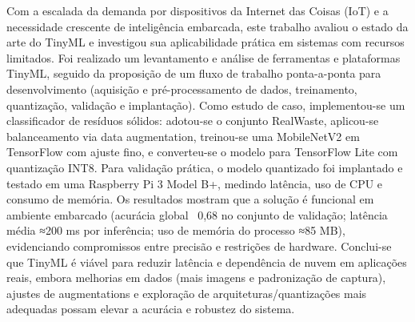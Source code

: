 \documentclass[repeatfields,xlists,xpacks,oneside]{ufrgscca}
\begin{document}
\begin{mainabstract}

Com a escalada da demanda por dispositivos da Internet das Coisas (IoT) e a necessidade crescente de inteligência embarcada, este trabalho avaliou o estado da arte do TinyML e investigou sua aplicabilidade prática em sistemas com recursos limitados. Foi realizado um levantamento e análise de ferramentas e plataformas TinyML, seguido da proposição de um fluxo de trabalho ponta-a-ponta para desenvolvimento (aquisição e pré-processamento de dados, treinamento, quantização, validação e implantação). Como estudo de caso, implementou-se um classificador de resíduos sólidos: adotou-se o conjunto RealWaste, aplicou-se balanceamento via data augmentation, treinou-se uma MobileNetV2 em TensorFlow com ajuste fino, e converteu-se o modelo para TensorFlow Lite com quantização INT8. Para validação prática, o modelo quantizado foi implantado e testado em uma Raspberry Pi 3 Model B+, medindo latência, uso de CPU e consumo de memória. Os resultados mostram que a solução é funcional em ambiente embarcado (acurácia global ~0,68 no conjunto de validação; latência média ≈200 ms por inferência; uso de memória do processo ≈85 MB), evidenciando compromissos entre precisão e restrições de hardware. Conclui-se que TinyML é viável para reduzir latência e dependência de nuvem em aplicações reais, embora melhorias em dados (mais imagens e padronização de captura), ajustes de augmentations e exploração de arquiteturas/quantizações mais adequadas possam elevar a acurácia e robustez do sistema.

\end{mainabstract}

\end{document}
